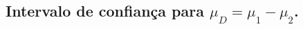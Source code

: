 \documentclass[9pt]{beamer}
\begin{document}
%	
%
%
%
%	
%	
%
%
%

\subsection{Intervalo de confiança para $\mu_D = \mu_1 - \mu_2$.}
\end{document}
